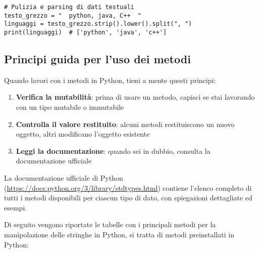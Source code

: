\begin{lstlisting}[style=pythonstyle]
# Pulizia e parsing di dati testuali
testo_grezzo = "  python, java, C++  "
linguaggi = testo_grezzo.strip().lower().split(", ")
print(linguaggi)  # ['python', 'java', 'c++']
\end{lstlisting}




\subsection*{Principi guida per l'uso dei metodi}

Quando lavori con i metodi in Python, tieni a mente questi principi:

\begin{enumerate}
    \item \textbf{Verifica la mutabilità}: prima di usare un metodo, capisci se stai lavorando con un tipo mutabile o immutabile
    \item \textbf{Controlla il valore restituito}: alcuni metodi restituiscono un nuovo oggetto, altri modificano l'oggetto esistente
    \item \textbf{Leggi la documentazione}: quando sei in dubbio, consulta la documentazione ufficiale
\end{enumerate}

\begin{nota}
La documentazione ufficiale di Python (\url{https://docs.python.org/3/library/stdtypes.html}) contiene l'elenco completo di tutti i metodi disponibili per ciascun tipo di dato, con spiegazioni dettagliate ed esempi.
\end{nota}

Di seguito vengono riportate le tabelle con i principali metodi per la manipolazione delle stringhe in Python, si tratta di metodi preinstallati in Python:


